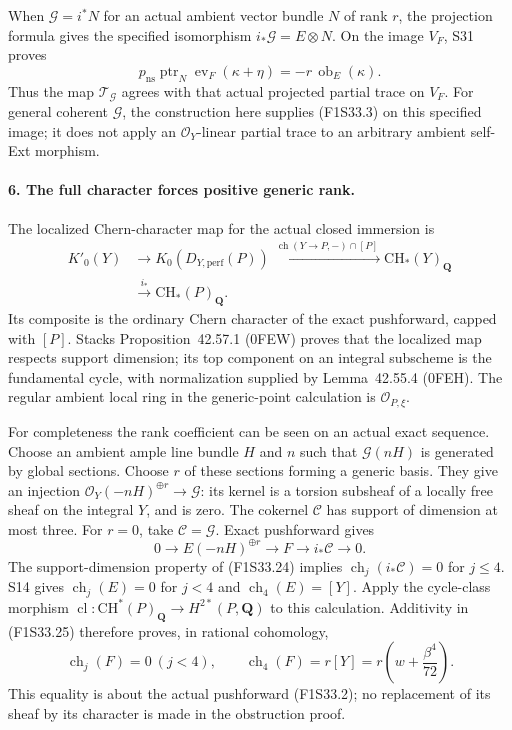 When $\mathcal G=i^*N$ for an actual ambient
vector bundle $N$ of rank $r$, the projection
formula gives the specified isomorphism
$i_*\mathcal G=E\otimes N$.
On the image $V_F$, S31 proves
\[
 p_{\mathrm{ns}}\operatorname{ptr}_N
                 \operatorname{ev}_F(\kappa+\eta)
               =-r\,\operatorname{ob}_E(\kappa).
 \tag{F1S33.23}
\]
Thus the map $\mathcal T_{\mathcal G}$ agrees
with that actual projected partial trace on
$V_F$. For general coherent $\mathcal G$, the
construction here supplies (F1S33.3) on this
specified image; it does not apply an
$\mathcal O_Y$-linear partial trace to an
arbitrary ambient self-Ext morphism.

\paragraph{6. The full character forces positive generic rank.}
The localized Chern-character map for the actual
closed immersion is
\[
\begin{split}
 K'_0(Y)&\longrightarrow K_0(D_{Y,\mathrm{perf}}(P))
       \xrightarrow{\ \operatorname{ch}(Y\to P,-)\cap[P]\ }
                     \mathrm{CH}_*(Y)_{\mathbf Q}\\
       &\xrightarrow{\ i_*\ }\mathrm{CH}_*(P)_{\mathbf Q}.
\end{split}
 \tag{F1S33.24}
\]
Its composite is the ordinary Chern character of
the exact pushforward, capped with $[P]$.
Stacks Proposition~42.57.1 (0FEW) proves that the
localized map respects support dimension; its
top component on an integral subscheme is the
fundamental cycle, with normalization supplied
by Lemma~42.55.4 (0FEH).
The regular ambient local ring in the
generic-point calculation is
$\mathcal O_{P,\xi}$.

For completeness the rank coefficient can be
seen on an actual exact sequence. Choose an
ambient ample line bundle $H$ and $n$ such that
$\mathcal G(nH)$ is generated by global sections.
Choose $r$ of these sections forming a generic
basis. They give an injection
$\mathcal O_Y(-nH)^{\oplus r}\to\mathcal G$:
its kernel is a torsion subsheaf of a locally
free sheaf on the integral $Y$, and is zero.
The cokernel $\mathcal C$ has support of
dimension at most three. For $r=0$, take
$\mathcal C=\mathcal G$.
Exact pushforward gives
\[
 0\longrightarrow E(-nH)^{\oplus r}
     \longrightarrow F\longrightarrow i_*\mathcal C
     \longrightarrow0.
 \tag{F1S33.25}
\]
The support-dimension property of (F1S33.24)
implies
$\operatorname{ch}_j(i_*\mathcal C)=0$ for $j\le4$.
S14 gives $\operatorname{ch}_j(E)=0$ for $j<4$
and $\operatorname{ch}_4(E)=[Y]$.
Apply the cycle-class morphism
$\operatorname{cl}:\mathrm{CH}^*(P)_{\mathbf Q}
 \to H^{2*}(P,\mathbf Q)$ to this calculation.
Additivity in (F1S33.25) therefore proves, in
rational cohomology,
\[
 \operatorname{ch}_j(F)=0\ (j<4),\qquad
 \operatorname{ch}_4(F)=r[Y]
        =r\left(w+\frac{\beta^4}{72}\right).
 \tag{F1S33.26}
\]
This equality is about the actual pushforward
(F1S33.2); no replacement of its sheaf by its
character is made in the obstruction proof.


